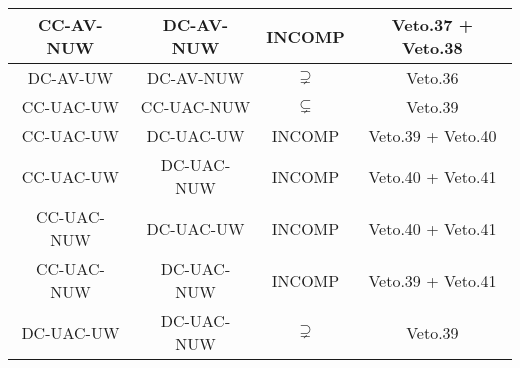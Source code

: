 \begin{longtable}{|c|c|c|c|}
\hline
CC-AV-NUW&DC-AV-NUW&INCOMP&Veto.37 + Veto.38\\
\hline
DC-AV-UW&DC-AV-NUW&$\supsetneq$&Veto.36\\
\hline
CC-UAC-UW&CC-UAC-NUW&$\subsetneq$&Veto.39\\
\hline
CC-UAC-UW&DC-UAC-UW&INCOMP&Veto.39 + Veto.40\\
\hline
CC-UAC-UW&DC-UAC-NUW&INCOMP&Veto.40 + Veto.41\\
\hline
CC-UAC-NUW&DC-UAC-UW&INCOMP&Veto.40 + Veto.41\\
\hline
CC-UAC-NUW&DC-UAC-NUW&INCOMP&Veto.39 + Veto.41\\
\hline
DC-UAC-UW&DC-UAC-NUW&$\supsetneq$&Veto.39\\
\hline
\end{longtable}
